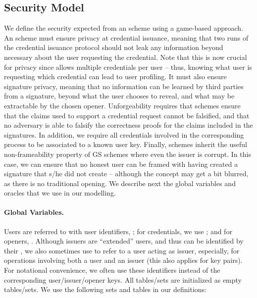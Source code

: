 \subsection{Security Model}
\label{ssec:model-uas}

We define the security expected from an \UAS scheme using a game-based approach.
An \UAS scheme must ensure privacy at credential issuance, meaning that two
runs of the credential issuance protocol should not leak any information beyond
necessary about the user requesting the credential. Note that this is now
crucial for privacy since \UAS allows multiple credentials per
user -- thus, knowing what user is requesting which credential can lead to user
profiling. It must also ensure signature privacy, meaning that no information
can be learned by third parties from a signature, beyond what the user chooses
to reveal, and what may be extractable by the chosen opener. Unforgeability
requires that \UAS schemes ensure that the claims used to support a credential
request cannot be falsified, and that no adversary is able to falsify
the correctness proofs for the claims included in the signatures. In addition,
we require all credentials involved in the corresponding process to be
associated to a known user key. Finally, \UAS schemes inherit the useful
non-frameability property of GS schemes where even the issuer is corrupt. In
this case, we can ensure that no honest user can be framed with having created a
signature that s/he did not create -- although the concept may get a bit
blurred, as there is no traditional opening.
%
We describe next the global variables and oracles that we use in our modelling.

\paragraph{Global Variables.} %
Users are referred to with user identifiers, \uid; for credentials, we use \cid;
and for openers, \oid. Although issuers are ``extended'' users, and thus can be
identified by their \uid, we also sometimes use \iid to refer to a user acting
as issuer, especially, for operations involving both a user and an issuer (this
also applies for key pairs).
%
For notational convenience, we often use these identifiers instead of the
corresponding user/issuer/opener keys.
%
All tables/sets are initialized as empty tables/sets. We use the following sets
and tables in our definitions:

